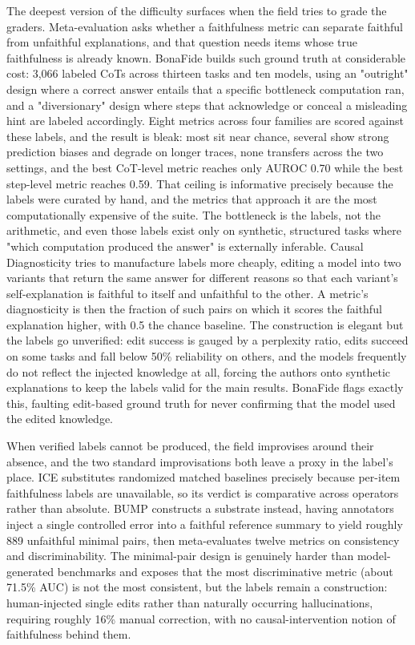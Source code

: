 \documentclass[conference]{IEEEtran}
\begin{document}
The deepest version of the difficulty surfaces when the field tries to grade the graders. Meta-evaluation asks whether a faithfulness metric can separate faithful from unfaithful explanations, and that question needs items whose true faithfulness is already known. BonaFide \cite{ref14} builds such ground truth at considerable cost: 3,066 labeled CoTs across thirteen tasks and ten models, using an "outright" design where a correct answer entails that a specific bottleneck computation ran, and a "diversionary" design where steps that acknowledge or conceal a misleading hint are labeled accordingly. Eight metrics across four families are scored against these labels, and the result is bleak: most sit near chance, several show strong prediction biases and degrade on longer traces, none transfers across the two settings, and the best CoT-level metric reaches only AUROC 0.70 while the best step-level metric reaches 0.59. That ceiling is informative precisely because the labels were curated by hand, and the metrics that approach it are the most computationally expensive of the suite. The bottleneck is the labels, not the arithmetic, and even those labels exist only on synthetic, structured tasks where "which computation produced the answer" is externally inferable. Causal Diagnosticity \cite{ref15} tries to manufacture labels more cheaply, editing a model into two variants that return the same answer for different reasons so that each variant's self-explanation is faithful to itself and unfaithful to the other. A metric's diagnosticity is then the fraction of such pairs on which it scores the faithful explanation higher, with 0.5 the chance baseline. The construction is elegant but the labels go unverified: edit success is gauged by a perplexity ratio, edits succeed on some tasks and fall below 50\% reliability on others, and the models frequently do not reflect the injected knowledge at all, forcing the authors onto synthetic explanations to keep the labels valid for the main results. BonaFide flags exactly this, faulting edit-based ground truth for never confirming that the model used the edited knowledge.

When verified labels cannot be produced, the field improvises around their absence, and the two standard improvisations both leave a proxy in the label's place. ICE \cite{ref17} substitutes randomized matched baselines precisely because per-item faithfulness labels are unavailable, so its verdict is comparative across operators rather than absolute. BUMP \cite{ref44} constructs a substrate instead, having annotators inject a single controlled error into a faithful reference summary to yield roughly 889 unfaithful minimal pairs, then meta-evaluates twelve metrics on consistency and discriminability. The minimal-pair design is genuinely harder than model-generated benchmarks and exposes that the most discriminative metric (about 71.5\% AUC) is not the most consistent, but the labels remain a construction: human-injected single edits rather than naturally occurring hallucinations, requiring roughly 16\% manual correction, with no causal-intervention notion of faithfulness behind them.
\end{document}
